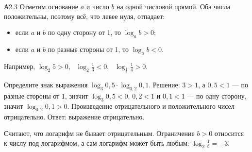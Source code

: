 \begin{tema}{А2.3}
 Отметим основание $a$ и число $b$ на одной числовой прямой.
Оба числа положительны, поэтому всё, что левее нуля, отпадает:
\begin{center}
\end{center}
\begin{itemize}[itemsep=0pt, topsep=2pt]
  \item если $a$ и $b$ по одну сторону от 1, то $\log_a b>0$;
  \item если $a$ и $b$ по разные стороны от 1, то $\log_a b<0$.
\end{itemize}
Например, $\log_2 5>0$, \ $\log_2\frac13<0$, \ $\log_{\frac13}\frac14>0$.

\begin{primer}
Определите знак выражения $\log_3 0{,}5\cdot\log_{0{,}2}0{,}1$.
Решение: $3>1$, а $0{,}5<1$ — по разные стороны от 1, значит $\log_3 0{,}5<0$.
$0{,}2<1$ и $0{,}1<1$ — по одну сторону, значит $\log_{0{,}2}0{,}1>0$.
Произведение отрицательного и положительного чисел отрицательно.
Ответ: выражение отрицательно.
\end{primer}

\begin{oshibka}
Считают, что логарифм не бывает отрицательным. Ограничение $b>0$ относится к числу
под логарифмом, а сам логарифм может быть любым: $\log_2\frac18=-3$.
\end{oshibka}
\end{tema}
